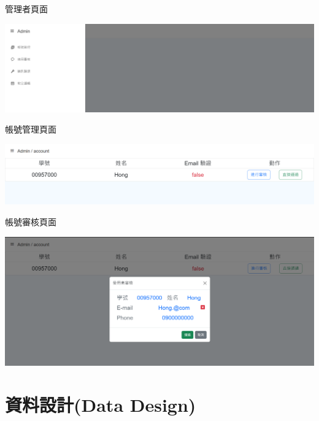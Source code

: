 \documentclass{article}
\begin{document}
\begin{Large}
	管理者頁面
\end{Large}

\begin{center}
	\includegraphics[scale=0.35]{SDDAdminPage.png}
\end{center}

\hspace*{\fill} 

\begin{Large}
	帳號管理頁面
\end{Large}

\begin{center}
	\includegraphics[scale=0.35]{SDDAdminAccountManage.png}
\end{center}

\hspace*{\fill} 

\begin{Large}
	帳號審核頁面
\end{Large}

\begin{center}
	\includegraphics[scale=0.35]{SDDAdminAccountVerify.png}
\end{center}

\newpage

\section[資料設計(DATA DESIGN)]{資料設計(Data Design)}
\end{document}
